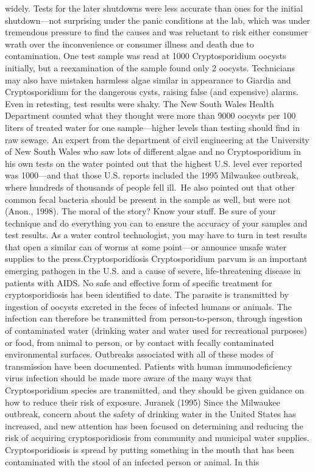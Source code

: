 \documentclass{article}
\begin{document}
widely. Tests for the later shutdowns were less accurate than ones for
the initial shutdown---not surprising under the panic conditions at the
lab, which was under tremendous pressure to find the causes and was
reluctant to risk either consumer wrath over the inconvenience or
consumer illness and death due to contamination. One test sample was
read at 1000 Cryptosporidium oocysts initially, but a reexamination of
the sample found only 2 oocysts. Technicians may also have mistaken
harmless algae similar in appearance to Giardia and Cryptosporidium for
the dangerous cysts, raising false (and expensive) alarms. Even in
retesting, test results were shaky. The New South Wales Health
Department counted what they thought were more than 9000 oocysts per 100
liters of treated water for one sample---higher levels than testing
should find in raw sewage. An expert from the department of civil
engineering at the University of New South Wales who saw lots of
different algae and no Cryptosporidium in his own tests on the water
pointed out that the highest U.S. level ever reported was 1000---and
that those U.S. reports included the 1995 Milwaukee outbreak, where
hundreds of thousands of people fell ill.~He also pointed out that other
common fecal bacteria should be present in the sample as well, but were
not (Anon., 1998). The moral of the story? Know your stuff. Be sure of
your technique and do everything you can to ensure the accuracy of your
samples and test results. As a water control technologist, you may have
to turn in test results that open a similar can of worms at some
point---or announce unsafe water supplies to the press.Cryptosporidiosis
Cryptosporidium parvum is an important emerging pathogen in the U.S. and
a cause of severe, life-threatening disease in patients with AIDS. No
safe and effective form of specific treatment for cryptosporidiosis has
been identified to date. The parasite is transmitted by ingestion of
oocysts excreted in the feces of infected humans or animals. The
infection can therefore be transmitted from person-to-person, through
ingestion of contaminated water (drinking water and water used for
recreational purposes) or food, from animal to person, or by contact
with fecally contaminated environmental surfaces. Outbreaks associated
with all of these modes of transmission have been documented. Patients
with human immunodeficiency virus infection should be made more aware of
the many ways that Cryptosporidium species are transmitted, and they
should be given guidance on how to reduce their risk of exposure.
Juranek (1995) Since the Milwaukee outbreak, concern about the safety of
drinking water in the United States has increased, and new attention has
been focused on determining and reducing the risk of acquiring
cryptosporidiosis from community and municipal water supplies.
Cryptosporidiosis is spread by putting something in the mouth that has
been contaminated with the stool of an infected person or animal. In
this
\end{document}
